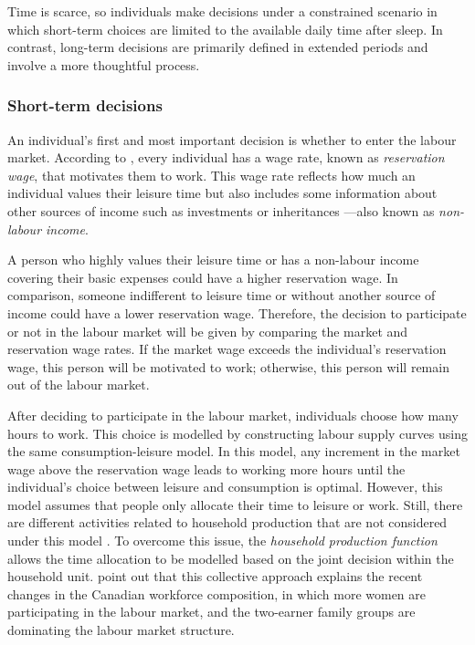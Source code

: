 Time is scarce, so individuals make decisions under a constrained scenario in which short-term choices are limited to the available daily time after sleep. In contrast, long-term decisions are primarily defined in extended periods and involve a more thoughtful process. 

\subsubsection{Short-term decisions}

An individual's first and most important decision is whether to enter the labour market. According to \citet{Borjas2020}, every individual has a wage rate, known as \textit{reservation wage}, that motivates them to work. This wage rate reflects how much an individual values their leisure time but also includes some information about other sources of income such as investments or inheritances —also known as \textit{non-labour income}. 

A person who highly values their leisure time or has a non-labour income covering their basic expenses could have a higher reservation wage. In comparison, someone indifferent to leisure time or without another source of income could have a lower reservation wage. Therefore, the decision to participate or not in the labour market will be given by comparing the market and reservation wage rates. If the market wage exceeds the individual's reservation wage, this person will be motivated to work; otherwise, this person will remain out of the labour market. 

After deciding to participate in the labour market, individuals choose how many hours to work. This choice is modelled by constructing labour supply curves using the same consumption-leisure model. In this model, any increment in the market wage above the reservation wage leads to working more hours until the individual's choice between leisure and consumption is optimal. However, this model assumes that people only allocate their time to leisure or work. Still, there are different activities related to household production that are not considered under this model \citep{Borjas2020}. To overcome this issue, the \textit{household production function} allows the time allocation to be modelled based on the joint decision within the household unit. \citet{Benjamin2021} point out that this collective approach explains the recent changes in the Canadian workforce composition, in which more women are participating in the labour market, and the two-earner family groups are dominating the labour market structure.

